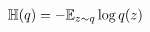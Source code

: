 \documentclass[a4paper,10pt]{article}
\newcommand{\conj}[1]{\overline{#1}}
\begin{document}
\begin{align}  \label{eq:c-gauss-entropy-derivation}
  \mathbb{H}(q)
    & = - \mathbb{E}_{z \sim q} \log{q(z)}
    \notag \\

\end{align}
\end{document}
